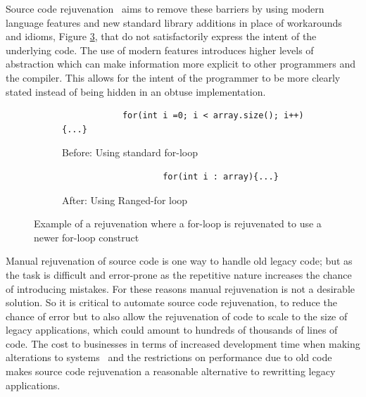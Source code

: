 \documentclass[bsc,frontabs,singlespacing,twoside,parskip,deptreport]{infthesis}
\begin{document}
Source code rejuvenation~\cite{STROUSTRUP_REJUV} aims to remove these barriers by using modern language features and new standard library additions in place of workarounds and idioms, Figure \ref{fig:example-rejuv}, that do not satisfactorily express the intent of the underlying code. The use of modern features introduces higher levels of abstraction which can make information more explicit to other programmers and the compiler. This allows for the intent of the programmer to be more clearly stated instead of being hidden in an obtuse implementation. 

\begin{figure}[H]
    \centering
    
    \begin{subfigure}[h]{\textwidth}
        \begin{verbatim}
            for(int i =0; i < array.size(); i++){...}
        \end{verbatim}
        \caption{Before: Using standard for-loop}
        \vspace{0.2cm}
        \label{fig:for-arr-before}
    \end{subfigure}
    
    \begin{subfigure}[h]{\textwidth}
        \centering
        \begin{verbatim}
                    for(int i : array){...}
        \end{verbatim}
        \caption{After: Using Ranged-for loop}
        \label{fig:for-arr-after}
    \end{subfigure}

    \caption{Example of a rejuvenation where a for-loop is rejuvenated to use a newer for-loop  construct}
    \label{fig:example-rejuv}
\end{figure}


Manual rejuvenation of source code is one way to handle old legacy code; but as the task is difficult and error-prone as the repetitive nature increases the chance of introducing mistakes. For these reasons manual rejuvenation is not a desirable solution. So it is critical to automate source code rejuvenation, to reduce the chance of error but to also allow the rejuvenation of code to scale to the size of legacy applications, which could amount to hundreds of thousands of lines of code. The cost to businesses in terms of increased development time when making alterations to systems~\cite{LEGACY_MOD} and the restrictions on performance due to old code~\cite{HPC} makes source code rejuvenation a reasonable alternative to rewritting legacy applications.
\end{document}
